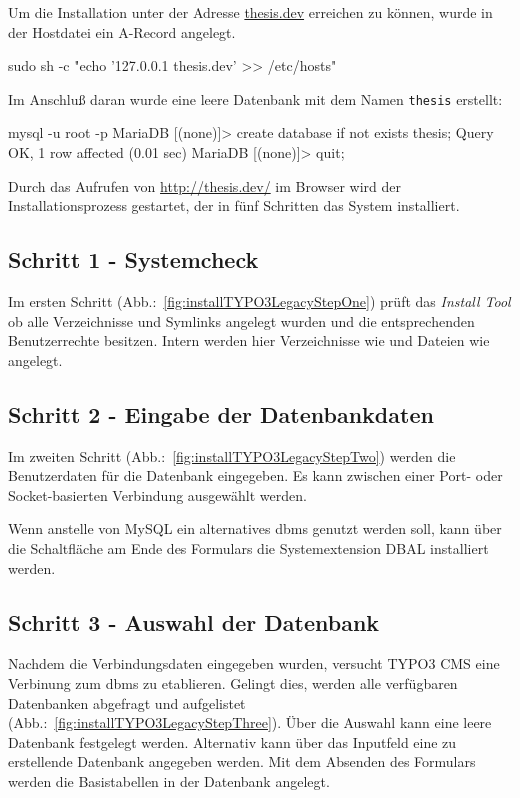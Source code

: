 Um die Installation unter der Adresse \url{thesis.dev} erreichen zu können, wurde in der Hostdatei ein A-Record angelegt.

\begin{shcode}
sudo sh -c "echo '127.0.0.1 thesis.dev' >> /etc/hosts"
\end{shcode}

Im Anschluß daran wurde eine leere Datenbank mit dem Namen \texttt{thesis} erstellt:

\begin{shcode}
mysql -u root -p
MariaDB [(none)]> create database if not exists thesis;
Query OK, 1 row affected (0.01 sec)
MariaDB [(none)]> quit;
\end{shcode}

Durch das Aufrufen von \url{http://thesis.dev/} im Browser wird der Installationsprozess gestartet, der in fünf Schritten das System installiert.

\subsection{Schritt 1 - Systemcheck}
\label{prototype:subsec:OneSystemcheck}
	Im ersten Schritt (Abb.:~\ref{fig:installTYPO3LegacyStepOne}) prüft das \textit{Install Tool} ob alle Verzeichnisse und Symlinks angelegt wurden und die entsprechenden Benutzerrechte besitzen. Intern werden hier Verzeichnisse wie  und Dateien wie  angelegt.

\subsection{Schritt 2 - Eingabe der Datenbankdaten}
\label{prototype:subsec:TwoInsertDatabaseData}
	Im zweiten Schritt (Abb.:~\ref{fig:installTYPO3LegacyStepTwo}) werden die Benutzerdaten für die Datenbank eingegeben. Es kann zwischen einer Port- oder Socket-basierten Verbindung ausgewählt werden.

	Wenn anstelle von MySQL ein alternatives \gls{dbms} genutzt werden soll, kann über die Schaltfläche am Ende des Formulars die Systemextension DBAL installiert werden.

\subsection{Schritt 3 - Auswahl der Datenbank}
\label{prototype:subsec:ThreeSelectDatabase}
	Nachdem die Verbindungsdaten eingegeben wurden, versucht TYPO3 CMS eine Verbinung zum \gls{dbms} zu etablieren. Gelingt dies, werden alle verfügbaren Datenbanken abgefragt und aufgelistet (Abb.:~\ref{fig:installTYPO3LegacyStepThree}). Über die Auswahl kann eine leere Datenbank festgelegt werden. Alternativ kann über das Inputfeld eine zu erstellende Datenbank angegeben werden. Mit dem Absenden des Formulars werden die Basistabellen in der Datenbank angelegt.

